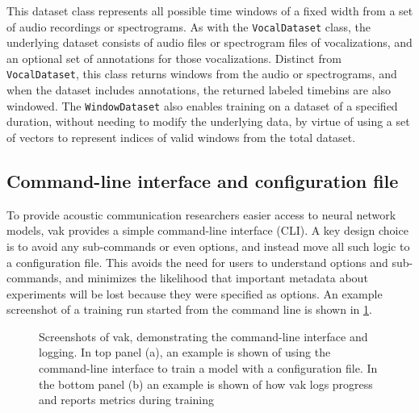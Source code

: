 This dataset class represents all possible time windows of a fixed width from a set of audio recordings or spectrograms.
As with the \texttt{VocalDataset} class, the underlying dataset consists of audio files or spectrogram files of vocalizations, and an optional set of annotations for those vocalizations.
Distinct from \texttt{VocalDataset},
this class returns windows from the audio or spectrograms,
and when the dataset includes annotations,
the returned labeled timebins are also windowed.
The \texttt{WindowDataset} also enables training on a dataset of a specified duration,
without needing to modify the underlying data,
by virtue of using a set of vectors to represent indices of valid windows from the total dataset.

\subsection{Command-line interface and configuration file \label{subsec:cli-config}}

To provide acoustic communication researchers easier access to neural network models, vak provides a simple command-line interface (CLI). A key design choice is to avoid any sub-commands or even options, and instead move all such logic to a configuration file. This avoids the need for users to understand options and sub-commands, and minimizes the likelihood that important metadata about experiments will be lost because they were specified as options. An example screenshot of a training run started from the command line is shown in \ref{fig:cli}.

\begin{figure}[]
    \noindent
    \caption{Screenshots of vak, demonstrating the command-line interface and logging. In top panel (a), an example is shown of using the command-line interface to train a model with a configuration file. In the bottom panel (b) an example is shown of how vak logs progress and reports metrics during training \label{fig:cli}}
\end{figure}


